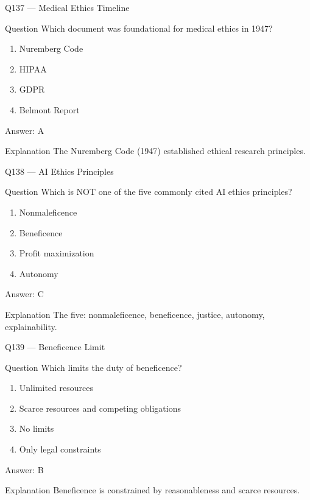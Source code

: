 \documentclass[aspectratio=169,8pt]{beamer}
\begin{document}
	\begin{frame}{Q137 --- Medical Ethics Timeline}
		\begin{block}{Question}
			Which document was foundational for medical ethics in 1947?
		\end{block}
		\begin{enumerate}
			\item Nuremberg Code
			\item HIPAA
			\item GDPR
			\item Belmont Report
		\end{enumerate}
		\begin{exampleblock}{Answer: A}\end{exampleblock}
		\begin{block}{Explanation}
			The Nuremberg Code (1947) established ethical research principles.
		\end{block}
	\end{frame}
	
	\begin{frame}{Q138 --- AI Ethics Principles}
		\begin{block}{Question}
			Which is NOT one of the five commonly cited AI ethics principles?
		\end{block}
		\begin{enumerate}
			\item Nonmaleficence
			\item Beneficence
			\item Profit maximization
			\item Autonomy
		\end{enumerate}
		\begin{exampleblock}{Answer: C}\end{exampleblock}
		\begin{block}{Explanation}
			The five: nonmaleficence, beneficence, justice, autonomy, explainability.
		\end{block}
	\end{frame}
	
	\begin{frame}{Q139 --- Beneficence Limit}
		\begin{block}{Question}
			Which limits the duty of beneficence?
			\begin{enumerate}
				\item Unlimited resources
				\item Scarce resources and competing obligations
				\item No limits
				\item Only legal constraints
			\end{enumerate}
		\end{block}
		\begin{exampleblock}{Answer: B}\end{exampleblock}
		\begin{block}{Explanation}
			Beneficence is constrained by reasonableness and scarce resources.
		\end{block}
	\end{frame}
	
\end{document}
